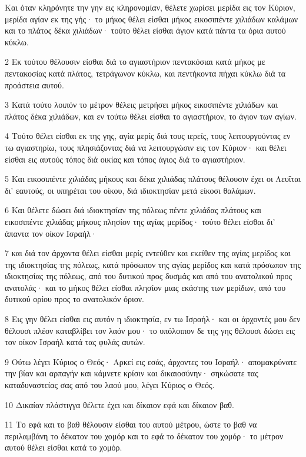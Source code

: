 \par Και όταν κληρόνητε την γην εις κληρονομίαν, θέλετε χωρίσει μερίδα εις τον Κύριον, μερίδα αγίαν εκ της γής· το μήκος θέλει είσθαι μήκος εικοσιπέντε χιλιάδων καλάμων και το πλάτος δέκα χιλιάδων· τούτο θέλει είσθαι άγιον κατά πάντα τα όρια αυτού κύκλω.
\par 2 Εκ τούτου θέλουσιν είσθαι διά το αγιαστήριον πεντακόσιαι κατά μήκος με πεντακοσίας κατά πλάτος, τετράγωνον κύκλω, και πεντήκοντα πήχαι κύκλω διά τα προάστεια αυτού.
\par 3 Κατά τούτο λοιπόν το μέτρον θέλεις μετρήσει μήκος εικοσιπέντε χιλιάδων και πλάτος δέκα χιλιάδων, και εν τούτω θέλει είσθαι το αγιαστήριον, το άγιον των αγίων.
\par 4 Τούτο θέλει είσθαι εκ της γης, αγία μερίς διά τους ιερείς, τους λειτουργούντας εν τω αγιαστηρίω, τους πλησιάζοντας διά να λειτουργώσιν εις τον Κύριον· και θέλει είσθαι εις αυτούς τόπος διά οικίας και τόπος άγιος διά το αγιαστήριον.
\par 5 Και εικοσιπέντε χιλιάδας μήκους και δέκα χιλιάδας πλάτους θέλουσιν έχει οι Λευΐται δι' εαυτούς, οι υπηρέται του οίκου, διά ιδιοκτησίαν μετά είκοσι θαλάμων.
\par 6 Και θέλετε δώσει διά ιδιοκτησίαν της πόλεως πέντε χιλιάδας πλάτους και εικοσιπέντε χιλιάδας μήκους πλησίον της αγίας μερίδος· τούτο θέλει είσθαι δι' άπαντα τον οίκον Ισραήλ·
\par 7 και διά τον άρχοντα θέλει είσθαι μερίς εντεύθεν και εκείθεν της αγίας μερίδος και της ιδιοκτησίας της πόλεως, κατά πρόσωπον της αγίας μερίδος και κατά πρόσωπον της ιδιοκτησίας της πόλεως, από του δυτικού προς δυσμάς και από του ανατολικού προς ανατολάς· και το μήκος θέλει είσθαι πλησίον μιας εκάστης των μερίδων, από του δυτικού ορίου προς το ανατολικόν όριον.
\par 8 Εις γην θέλει είσθαι εις αυτόν η ιδιοκτησία, εν τω Ισραήλ· και οι άρχοντές μου δεν θέλουσι πλέον καταβλίβει τον λαόν μου· το υπόλοιπον δε της γης θέλουσι δώσει εις τον οίκον Ισραήλ κατά τας φυλάς αυτών.
\par 9 Ούτω λέγει Κύριος ο Θεός· Αρκεί εις εσάς, άρχοντες του Ισραήλ· απομακρύνατε την βίαν και αρπαγήν και κάμνετε κρίσιν και δικαιοσύνην· σηκώσατε τας καταδυναστείας σας από του λαού μου, λέγει Κύριος ο Θεός.
\par 10 Δικαίαν πλάστιγγα θέλετε έχει και δίκαιον εφά και δίκαιον βαθ.
\par 11 Το εφά και το βαθ θέλουσιν είσθαι του αυτού μέτρου, ώστε το βαθ να περιλαμβάνη το δέκατον του χομόρ και το εφά το δέκατον του χομόρ· το μέτρον αυτού θέλει είσθαι κατά το χομόρ.
